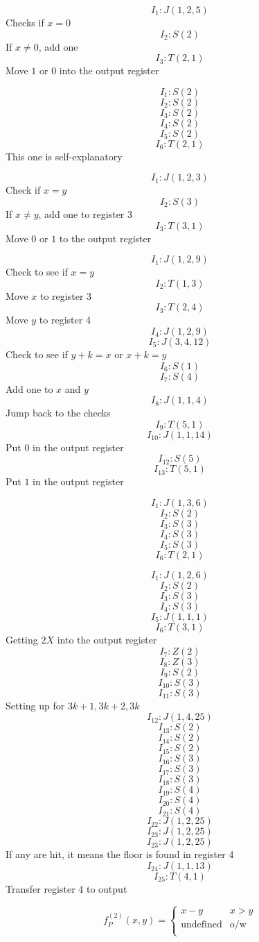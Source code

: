 \begin{exe}[3.3.1a]
    \[I_1: J(1, 2, 5)\]
    Checks if $x = 0$
    \[I_2: S(2)\]
    If $x \neq 0$, add one
    \[I_3: T(2, 1)\]
    Move $1$ or $0$ into the output register
\end{exe}
\begin{exe}[3.3.1b]
\[I_1: S(2)\]
\[I_2: S(2)\]
\[I_3: S(2)\]
\[I_4: S(2)\]
\[I_5: S(2)\]
\[I_6: T(2, 1)\]
This one is self-explanatory
\end{exe}
\begin{exe}[3.3.1c]
\[I_1: J(1, 2, 3)\]
Check if $x = y$
\[I_2: S(3)\]
If $x \neq y$, add one to register $3$
\[I_3: T(3, 1)\]
Move $0$ or $1$ to the output register
\end{exe}
\begin{exe}[3.3.1d]
\[I_1: J(1, 2, 9)\]
Check to see if $x = y$
\[I_2: T(1, 3)\]
Move $x$ to register 3
\[I_3: T(2, 4)\]
Move $y$ to register 4
\[I_4: J(1, 2, 9)\]
\[I_5: J(3, 4, 12)\]
Check to see if $y + k = x$ or $x + k = y$
\[I_6: S(1)\]
\[I_7: S(4)\]
Add one to $x$ and $y$
\[I_8: J(1, 1, 4)\]
Jump back to the checks
\[I_9: T(5, 1)\]
\[I_{10}: J(1, 1, 14)\]
Put $0$ in the output register
\[I_{12}: S(5)\]
\[I_{13}: T(5, 1)\]
Put $1$ in the output register
\end{exe}
\begin{exe}[3.3.1e]
\[I_1: J(1, 3, 6)\]
\[I_2: S(2)\]
\[I_3: S(3)\]
\[I_4: S(3)\]
\[I_5: S(3)\]
\[I_6: T(2, 1)\]
\end{exe} 
\begin{exe}[3.3.1f]
\[I_1: J(1, 2, 6)\]
\[I_2: S(2)\]
\[I_3: S(3)\]
\[I_4: S(3)\]
\[I_5: J(1, 1, 1)\]
\[I_6: T(3, 1)\]
Getting $2X$ into the output register
\[I_7: Z(2)\]
\[I_8: Z(3)\]
\[I_9: S(2)\]
\[I_{10}: S(3)\]
\[I_{11}: S(3)\]
Setting up for $3k + 1, 3k + 2, 3k$
\[I_{12}: J(1, 4, 25)\]
\[I_{13}: S(2)\]
\[I_{14}: S(2)\]
\[I_{15}: S(2)\]
\[I_{16}: S(3)\]
\[I_{17}: S(3)\]
\[I_{18}: S(3)\]
\[I_{19}: S(4)\]
\[I_{20}: S(4)\]
\[I_{21}: S(4)\]
\[I_{22}: J(1, 2, 25)\]
\[I_{23}: J(1, 2, 25)\]
\[I_{23}: J(1, 2, 25)\]
If any are hit, it means the floor is found in register 4
\[I_{24}: J(1, 1, 13)\]
\[I_{25}: T(4, 1)\]
Transfer register 4 to output


\end{exe}
\begin{exe}[3.3.2]
\[f_P^{(2)}(x, y) = \begin{cases} 
      x - y & x > y \\
      \text{undefined} & \text{o/w} \\
   \end{cases}\]
\end{exe}
